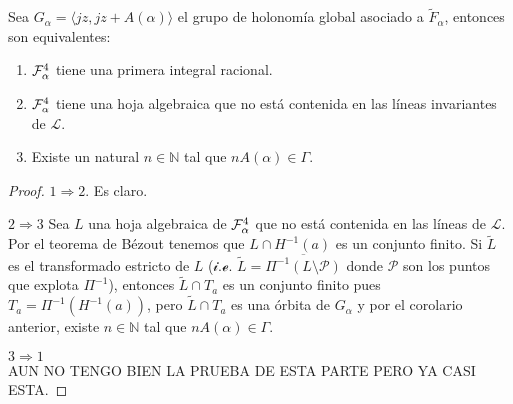 \begin{Proposicion}
\label{Prop:EquivalenciasIntegrabilidad}
Sea $G_{\alpha}=\langle jz,jz+A(\alpha)\rangle$ el grupo de holonomía global asociado a $\tilde{F}_{\alpha}$, entonces son equivalentes:
\begin{enumerate}
\item $\mathcal{F}_{\alpha}^{4}$ tiene una primera integral racional.
\item $\mathcal{F}_{\alpha}^{4}$ tiene una hoja algebraica que no está contenida en las líneas invariantes de $\mathcal{L}$.
\item Existe un natural $n\in\mathbb{N}$ tal que $nA(\alpha)\in\Gamma$.
\end{enumerate}
\end{Proposicion} 
\begin{proof}
$1\Rightarrow 2$. Es claro.

\noindent $2\Rightarrow 3$ Sea $L$ una hoja algebraica de $\mathcal{F}_{\alpha}^{4}$ que no está contenida en las líneas de $\mathcal{L}$. Por el teorema de Bézout tenemos que $L\cap H^{-1}(a)$ es un conjunto finito. Si $\tilde{L}$ es el transformado estricto de $L$ ($\mathcal{i.e.}$ $\tilde{L}=\overline{\Pi^{-1}(L\setminus\mathcal{P})}$ donde $\mathcal{P}$ son los puntos que explota $\Pi^{-1}$), entonces $\tilde{L}\cap T_{a}$ es un conjunto finito pues $T_{a}=\Pi^{-1}(H^{-1}(a))$, pero $\tilde{L}\cap T_{a}$ es una órbita de $G_{\alpha}$ y por el corolario anterior, existe $n\in\mathbb{N}$ tal que $nA(\alpha)\in\Gamma$.

\noindent $3\Rightarrow 1$\\AUN NO TENGO BIEN LA PRUEBA DE ESTA PARTE PERO YA CASI ESTA.
\end{proof}
